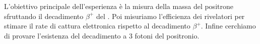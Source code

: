L'obiettivo principale dell'esperienza è la misura della massa del positrone sfruttando il decadimento $\beta^+$ del \na{}. Poi misuriamo l'efficienza dei rivelatori per stimare il rate di cattura elettronica rispetto al decadimento $\beta^+$. Infine cerchiamo di provare l'esistenza del decadimento a 3 fotoni del positronio.
